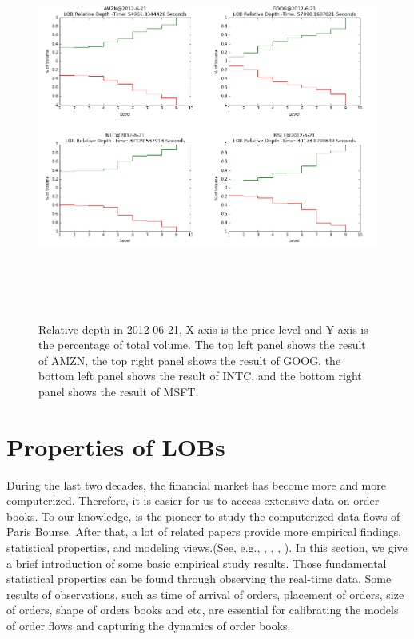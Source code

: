 \begin{figure} [hp]
  \begin{center}
    \includegraphics[width=6in,  height=5in]{figures/depth.png}
  \end{center}
\caption{Relative depth in 2012-06-21,   X-axis is the price level and Y-axis is the percentage of total volume. The top left panel shows the result of AMZN,   the top right panel shows the result of GOOG,  the bottom left panel shows the result of INTC,   and the bottom right panel shows the result of MSFT. } \label{fig:depth}
\end{figure}


\section{Properties of LOBs}
During the last two decades,  the financial market has become more and more computerized. Therefore,  it is easier for us to access extensive data on order books. To our knowledge,  \cite{biais1995empirical} is the pioneer to study the computerized data flows of Paris Bourse. After that,  a lot of related papers provide more empirical findings, statistical properties, and modeling views.(See, e.g.\cite{gopikrishnan2000statistical}, \cite{challet2001analyzing}, \cite{maslov2001price}, \cite{bouchaud2002statistical}, \cite{potters2003more}).  In this section,  we give a brief introduction of some basic empirical study results. Those fundamental statistical properties can be found through observing the real-time data. Some results of observations,  such as time of arrival of orders,  placement of orders,  size of orders,  shape of orders books and etc,  are essential for calibrating the models of order flows and capturing the dynamics of order books. 

